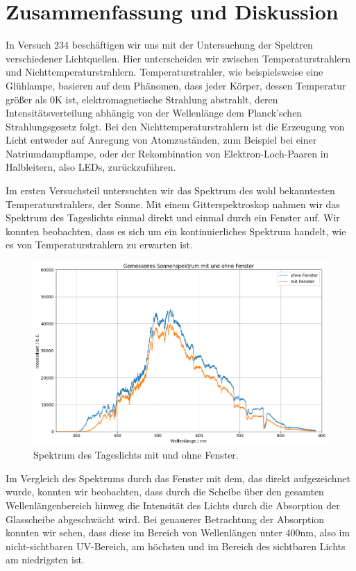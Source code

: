 \section{Zusammenfassung und Diskussion}

In Versuch 234 beschäftigen wir uns mit der Untersuchung der Spektren verschiedener Lichtquellen. Hier unterscheiden wir zwischen Temperaturstrahlern und Nichttemperaturstrahlern. Temperaturstrahler, wie beispielsweise eine Glühlampe, basieren auf dem Phänomen, dass jeder Körper, dessen Temperatur größer als $0\si{\kelvin}$ ist, elektromagnetische Strahlung abstrahlt, deren Intensitätsverteilung abhängig von der Wellenlänge dem Planck'schen Strahlungsgesetz folgt. Bei den Nichttemperaturstrahlern ist die Erzeugung von Licht entweder auf Anregung von Atomzuständen, zum Beispiel bei einer Natriumdampflampe, oder der Rekombination von Elektron-Loch-Paaren in Halbleitern, also LEDs, zurückzuführen.

Im ersten Versuchsteil untersuchten wir das Spektrum des wohl bekanntesten Temperaturstrahlers, der Sonne. Mit einem Gitterspektroskop nahmen wir das Spektrum des Tageslichts einmal direkt und einmal durch ein Fenster auf. Wir konnten beobachten, dass es sich um ein kontinuierliches Spektrum handelt, wie es von Temperaturstrahlern zu erwarten ist. 

\begin{figure}[H]
  \centering
  \includegraphics[width=.9\textwidth]{files/plots/himmel_m_o_g.png}
  \caption{Spektrum des Tageslichts mit und ohne Fenster.}
  \label{fig:himmel_m_o_g_zsmf}
\end{figure}


Im Vergleich des Spektrums durch das Fenster mit dem, das direkt aufgezeichnet wurde, konnten wir beobachten, dass durch die Scheibe über den gesamten Wellenlängenbereich hinweg die Intensität des Lichts durch die Absorption der Glasscheibe abgeschwächt wird. Bei genauerer Betrachtung der Absorption konnten wir sehen, dass diese im Bereich von Wellenlängen unter $400\si{\nano\meter}$, also im nicht-sichtbaren UV-Bereich, am höchsten und im Bereich des sichtbaren Lichts am niedrigsten ist.


